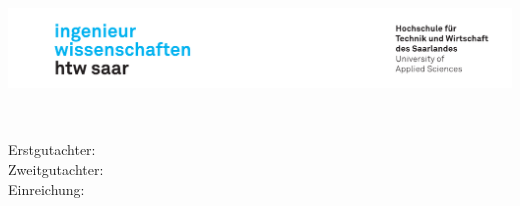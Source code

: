 \begin{titlepage}
\includegraphics[width=\linewidth]{Graphics/htwsaar_Logo_inwi_head_VF_4C_crop}
  \begin{center}
    \large  
    \hfill
    \vfill
    \begingroup
      \Large\bfseries\myTitle \\ \bigskip
    \endgroup

  \myDegree %

  \vfill
  \myName
  \vfill
  Erstgutachter: \myFirstProf \\
  Zweitgutachter: \mySecondProf \\ %
  Einreichung: \myTime

    \end{center}       
\end{titlepage}   